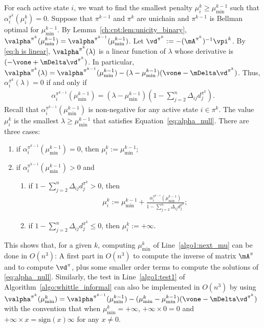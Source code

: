 For each active state $i$, we want to find the smallest penalty $\mu^k_i\ge\mu^{k-1}_{\min}$ such that $\alpha^{\pi^k}_i(\mu^k_i)=0$.
Suppose that $\pi^{k-1}$ and $\pi^k$ are unichain and $\pi^{k-1}$ is Bellman optimal for $\mu^{k-1}_{\min}$.
By Lemma~\ref{ch:cpt:lem:unicity_binary}, $\valpha^{\pi^k}(\mu^{k-1}_{\min})= \valpha^{\pi^{k-1}}(\mu^{k-1}_{\min})$.
Let $\vd^{\pi^k}:=-(\mA^{\pi^k})^{-1}{\vpi^k}$.
By \eqref{eq:h is linear}, $\valpha^{\pi^k}(\lambda)$ is a linear function of $\lambda$ whose derivative is $(-\vone+\mDelta\vd^{\pi^k})$.
In particular, $\valpha^{\pi^k}(\lambda)=\valpha^{\pi^{k-1}}(\mu^{k-1}_{\min}) -(\lambda-\mu^{k-1}_{\min})(\vone -\mDelta\vd^{\pi^k})$.
Thus, $\alpha^{\pi^k}_i(\lambda)=0$ if and only if
\begin{align}
    \label{eq:alpha_null}
    \alpha^{\pi^{k-1}}_i(\mu^{k-1}_{\min}) = (\lambda -\mu^{k-1}_{\min})(1 -\sum_{j=2}^n\Delta_{ij} d_j^{\pi^k}).
\end{align}
Recall that $\alpha^{\pi^{k-1}}_i(\mu^{k-1}_{\min})$ is non-negative for any active state $i\in\pi^k$. The value $\mu^k_i$ is the smallest $\lambda\ge\mu^{k-1}_{\min}$ that satisfies Equation~\eqref{eq:alpha_null}. There are three cases: 
\begin{enumerate}
    \item if $\alpha^{\pi^{k-1}}_i(\mu^{k-1}_{\min})=0$, then $\mu^k_i:=\mu^{k-1}_{\min}$;
    \item if $\alpha^{\pi^{k-1}}_i(\mu^{k-1}_{\min})>0$ and
        \begin{enumerate}
            \item if $1 -\sum_{j=2}^n\Delta_{ij} d_j^{\pi^k}>0$, then
            \begin{align}
                \label{eq:mu_i_k_from_d}
                \mu^k_i:=\mu^{k-1}_{\min} +\frac{ \alpha^{\pi^{k-1}}_i(\mu^{k-1}_{\min})}{1 -\sum_{j=2}^n\Delta_{ij} d_j^{\pi^k}};
            \end{align}
            \item if $1 -\sum_{j=2}^n\Delta_{ij} d_j^{\pi^k}\le0$, then $\mu^k_i:=+\infty$.
        \end{enumerate}
\end{enumerate}
This shows that, for a given $k$, computing $\mu^k_{\min}$ of Line~\ref{algo1:next_mu} can be done in $O(n^3)$: A first part in  $O(n^3)$ to compute the inverse of matrix $\mA^{\pi}$ and to compute $\vd^\pi$, plus some smaller order terms to compute the solutions of \eqref{eq:alpha_null}.
Similarly, the test in Line~\ref{algo1:test1} of Algorithm~\ref{algo:whittle_informal} can also be implemented in $O(n^3)$ by using $\valpha^{\pi^k}(\mu^k_{\min}) =\valpha^{\pi^{k-1}}(\mu^{k-1}_{\min}) -(\mu^k_{\min} -\mu^{k-1}_{\min})(\vone -\mDelta\vd^{\pi^k})$ with the convention that when $\mu^k_{\min} = +\infty$, $+\infty\times0=0$ and $+\infty\times x=\mathrm{sign}(x)\infty$ for any $x\ne0$. 

